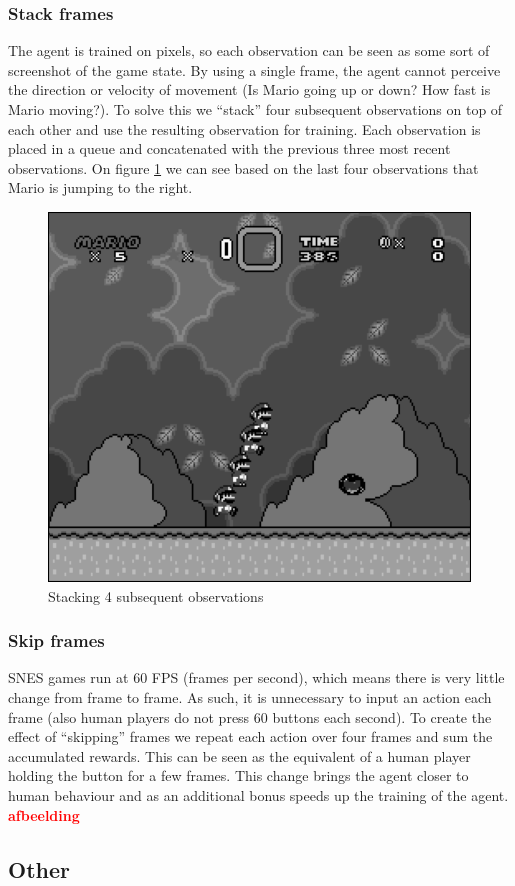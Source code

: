 \documentclass{article}
\begin{document}
    \subsubsection{Stack frames}
    The agent is trained on pixels, so each observation can be seen as some sort of screenshot of the game state.
    By using a single frame, the agent cannot perceive the direction or velocity of movement (Is Mario going up or down? How fast is Mario moving?).
    To solve this we ``stack'' four subsequent observations on top of each other and use the resulting observation for training.
    Each observation is placed in a queue and concatenated with the previous three most recent observations.
    On figure \ref{fig:stack} we can see based on the last four observations that Mario is jumping to the right.
    \begin{figure}[ht]
        \centering
        \includegraphics[width=.6\textwidth]{stacked}
        \caption{Stacking 4 subsequent observations}
        \label{fig:stack}
    \end{figure}
    \subsubsection{Skip frames}
    SNES games run at 60 FPS (frames per second), which means there is very little change from frame to frame.
    As such, it is unnecessary to input an action each frame (also human players do not press 60 buttons each second).
    To create the effect of ``skipping'' frames we repeat each action over four frames and sum the accumulated rewards.
    This can be seen as the equivalent of a human player holding the button for a few frames.
    This change brings the agent closer to human behaviour and as an additional bonus speeds up the training of the agent.
    \textbf{\textcolor{red}{afbeelding}}
    \subsection{Other}
\end{document}

